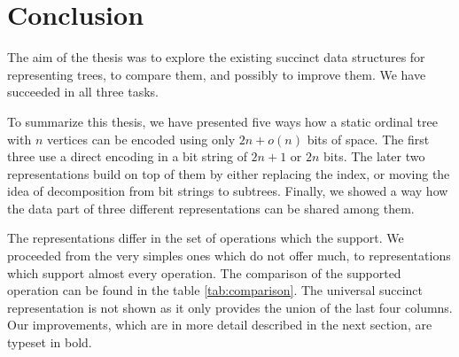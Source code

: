 \chapter*{Conclusion}
\setcounter{chapter}{\thechapter+1}

The aim of the thesis was to explore the existing succinct data structures for representing trees, to compare them, and possibly to improve them.
We have succeeded in all three tasks.

\bigbreak

To summarize this thesis, we have presented five ways how a static ordinal tree with $n$ vertices can be encoded using only $2n + o(n)$ bits of space.
The first three use a direct encoding in a bit string of $2n + 1$ or $2n$ bits.
The later two representations build on top of them by either replacing the index, or moving the idea of decomposition from bit strings to subtrees.
Finally, we showed a way how the data part of three different representations can be shared among them.

The representations differ in the set of operations which the support.
We proceeded from the very simples ones which do not offer much, to representations which support almost every operation.
The comparison of the supported operation can be found in the table \ref{tab:comparison}.
The universal succinct representation is not shown as it only provides the union of the last four columns.
Our improvements, which are in more detail described in the next section, are typeset in bold.

